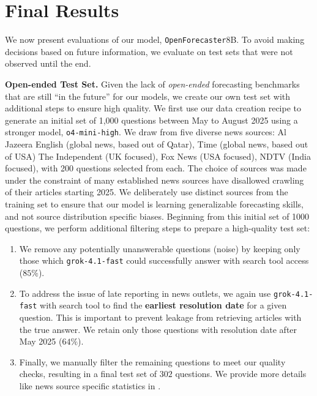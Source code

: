 \documentclass{article} %
\newcommand{\ourmodel}{\texttt{OpenForecaster}}
\begin{document}


\vspace{-0.2cm}
\section{Final Results}
\label{sec:results}

 We now present evaluations of our model, \ourmodel 8B. To avoid making decisions based on future information, we evaluate on test sets that were not observed until the end.\vspace{0.15cm}

\textbf{Open-ended Test Set.} Given the lack of \emph{open-ended} forecasting benchmarks that are still ``in the future'' for our models, we create our own test set with additional steps to ensure high quality. We first use our data creation recipe to generate an initial set of 1,000 questions between May to August 2025 using a stronger model, \texttt{o4-mini-high}. We draw from five diverse news sources: Al Jazeera English (global news, based out of Qatar), Time (global news, based out of USA) The Independent (UK focused), Fox News (USA focused), NDTV (India focused), with 200 questions selected from each. The choice of sources was made under the constraint of many established news sources have disallowed crawling of their articles starting 2025.
We deliberately use distinct sources from the training set to ensure that our model is learning generalizable forecasting skills, and not source distribution specific biases. Beginning from this initial set of 1000 questions, we perform additional filtering steps to prepare a high-quality test set: 
\begin{enumerate}
    \item We remove any potentially unanswerable questions (noise) by keeping only those which \texttt{grok-4.1-fast} could successfully answer with search tool access ($85\%$).
    \item To address the issue of late reporting in news outlets, we again use \texttt{grok-4.1-fast} with search tool to find the \textbf{earliest resolution date} for a given question. This is important to prevent leakage from retrieving articles with the true answer. We retain only those questions with resolution date after May 2025 ($64\%$).
    \item Finally, we manually filter the remaining questions to meet our quality checks, resulting in a final test set of $302$ questions. We provide more details like news source specific statistics in .
\end{enumerate} 
\end{document}
